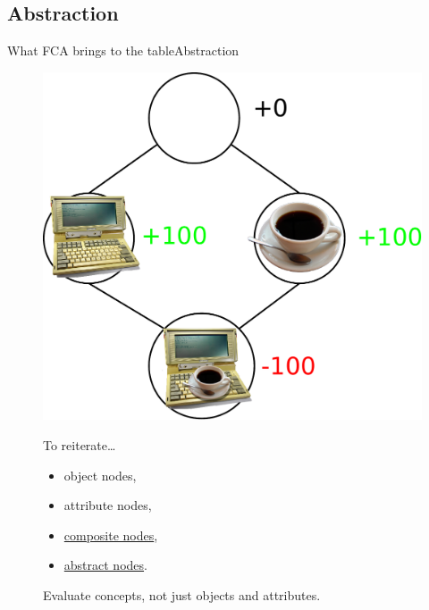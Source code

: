 \subsection{Abstraction}
\begin{frame}{What FCA brings to the table}{Abstraction}
\begin{figure}[ht]
\begin{minipage}[t]{0.55\linewidth}
\vspace{0pt}
\centering
\includegraphics[width=\textwidth]{img/introduction/fca_coffee.pdf}
\end{minipage}
\hfill
\begin{minipage}[t]{0.40\linewidth}
\vspace{0pt}
\begin{block}{To reiterate\ldots}
\begin{itemize}
\item object nodes,
\item attribute nodes,
\item \underline{composite nodes},
\item \underline{abstract nodes}.
\end{itemize}
\vspace{0.4cm}
Evaluate concepts, not just objects and attributes.
\end{block}
\end{minipage}
\end{figure}

\end{frame}


